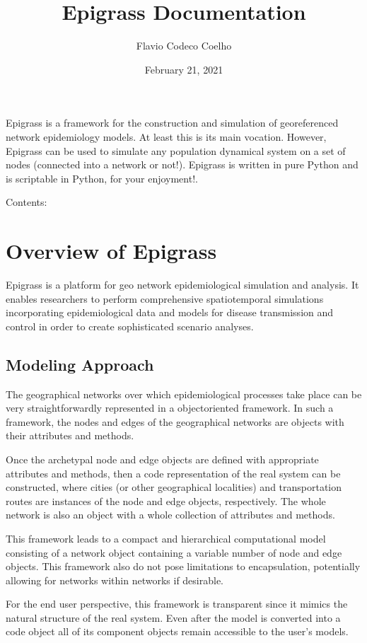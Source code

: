 \documentclass[letterpaper,10pt,english]{sphinxmanual}
\title{Epigrass Documentation}
\date{February 21, 2021}
\author{Flavio Codeco Coelho}
\begin{document}
\pagestyle{empty}
\sphinxmaketitle
\pagestyle{plain}
\sphinxtableofcontents
\pagestyle{normal}
\label{\detokenize{index::doc}}


Epigrass is a framework for the construction and simulation of geo\sphinxhyphen{}referenced
network epidemiology models. At least this is its main vocation.
However, Epigrass can be used to simulate any population dynamical system on a set
of nodes (connected into a network or not!). Epigrass is written in pure
Python and is scriptable in Python, for your enjoyment!.

Contents:


\chapter{Overview of Epigrass}
\label{\detokenize{overview:overview-of-epigrass}}\label{\detokenize{overview::doc}}
Epigrass is a platform for geo network epidemiological simulation and analysis. It enables researchers to perform
comprehensive spatio\sphinxhyphen{}temporal simulations incorporating epidemiological data and models for disease transmission and
control in order to create sophisticated scenario analyses.


\section{Modeling Approach}
\label{\detokenize{overview:modeling-approach}}
The geographical networks  over which epidemiological processes take place can be very straightforwardly represented in
a object\sphinxhyphen{}oriented framework. In such a framework, the nodes and edges of the geographical networks are objects with
their attributes and methods.

Once the archetypal node and edge objects are defined with appropriate attributes and methods, then a code
representation of the real system can be constructed, where cities (or other geographical localities) and
transportation routes are instances of the node and edge objects, respectively. The whole network is also an object
with a whole collection of attributes and methods.

This framework leads to a compact and hierarchical computational model consisting of a network object containing a
variable number of node and edge objects. This framework also do not pose limitations to encapsulation, potentially
allowing for networks within networks if desirable.

For the end user perspective, this framework is transparent since it mimics the natural structure of the real system.
Even after the model is converted into a code object all of its component objects remain accessible to the user’s  models.
\end{document}
